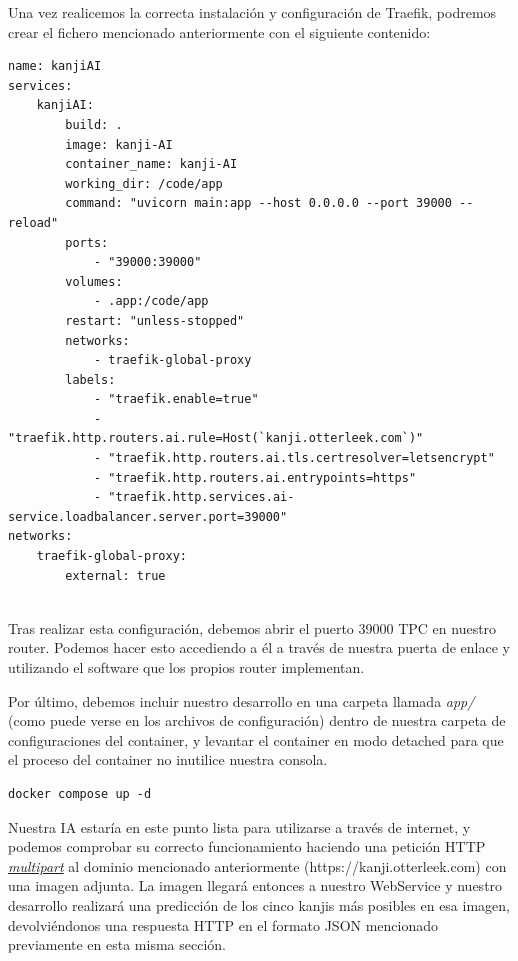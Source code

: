 \documentclass{article}
\begin{document}
Una vez realicemos la correcta instalación y configuración de Traefik, podremos crear el fichero mencionado anteriormente con el siguiente contenido:

\noindent\begin{minipage}{\textwidth}
\begin{lstlisting}[numbers=none]
name: kanjiAI
services:
	kanjiAI:
    	build: .
    	image: kanji-AI
    	container_name: kanji-AI
    	working_dir: /code/app
    	command: "uvicorn main:app --host 0.0.0.0 --port 39000 --reload"
    	ports:
        	- "39000:39000"
    	volumes:
        	- .app:/code/app
    	restart: "unless-stopped"
    	networks:
        	- traefik-global-proxy
    	labels:
        	- "traefik.enable=true"
        	- "traefik.http.routers.ai.rule=Host(`kanji.otterleek.com`)"
        	- "traefik.http.routers.ai.tls.certresolver=letsencrypt"
        	- "traefik.http.routers.ai.entrypoints=https"
        	- "traefik.http.services.ai-service.loadbalancer.server.port=39000"
networks:
	traefik-global-proxy:
    	external: true
   	 
\end{lstlisting}
\end{minipage}

Tras realizar esta configuración, debemos abrir el puerto 39000 TPC en nuestro router. Podemos hacer esto accediendo a él a través de nuestra puerta de enlace y utilizando el software que los propios router implementan.

Por último, debemos incluir nuestro desarrollo en una carpeta llamada \textit{app/} (como puede verse en los archivos de configuración) dentro de nuestra carpeta de configuraciones del container, y levantar el container en modo detached para que el proceso del container no inutilice nuestra consola.

\noindent\begin{minipage}{\textwidth}
\begin{lstlisting}[numbers=none]
docker compose up -d
\end{lstlisting}
\end{minipage}
Nuestra IA estaría en este punto lista para utilizarse a través de internet, y podemos comprobar su correcto funcionamiento haciendo una petición HTTP \hyperref[sec:terms]{\textit{multipart}\tec} al dominio mencionado anteriormente (https://kanji.otterleek.com) con una imagen adjunta. La imagen llegará entonces a nuestro WebService y nuestro desarrollo realizará una predicción de los cinco kanjis más posibles en esa imagen, devolviéndonos una respuesta HTTP en el formato JSON mencionado previamente en esta misma sección.
\end{document}
